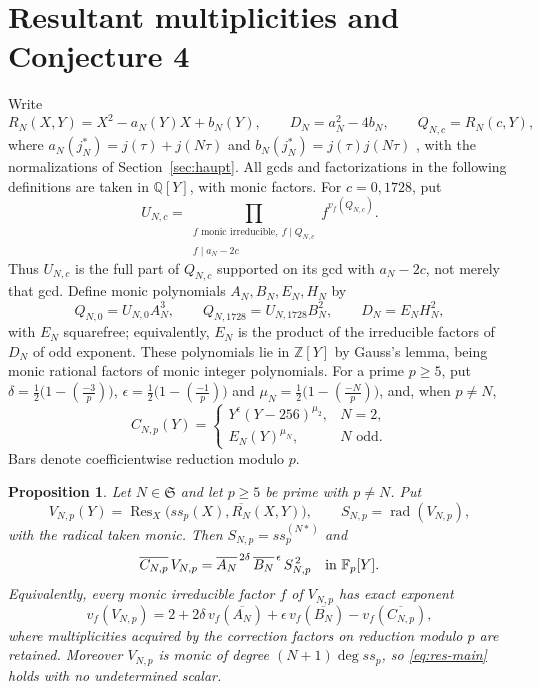 \documentclass[11pt,a4paper]{article}
\newtheorem{proposition}[theorem]{Proposition}
\theoremstyle{remark}\newtheorem{remark}[theorem]{Remark}
\numberwithin{equation}{section}
\newcommand{\Q}{\mathbb Q}\newcommand{\Z}{\mathbb Z}
\newcommand{\leg}[2]{\left(\frac{#1}{#2}\right)}
\begin{document}
	\section{Resultant multiplicities and Conjecture 4}\label{sec:resultant}
	Write
	\[
	R_N(X,Y)=X^2-a_N(Y)X+b_N(Y),\qquad D_N=a_N^2-4b_N,\qquad Q_{N,c}=R_N(c,Y),
	\]
	where $a_N(j_N^*)=j(\tau)+j(N\tau)$ and $b_N(j_N^*)=j(\tau)j(N\tau)$ \cite[Proposition~4]{Nakaya}, with the normalizations of Section~\ref{sec:haupt}. All gcds and factorizations in the following definitions are taken in $\Q[Y]$, with monic factors. For $c=0,1728$, put
	\begin{equation}\label{eq:res-U}
		U_{N,c}=\prod_{\substack{f\text{ monic irreducible},\ f\mid Q_{N,c}\\ f\mid a_N-2c}} f^{v_f(Q_{N,c})}.
	\end{equation}
	Thus $U_{N,c}$ is the full part of $Q_{N,c}$ supported on its gcd with $a_N-2c$, not merely that gcd. Define monic polynomials $A_N,B_N,E_N,H_N$ by
	\begin{equation}\label{eq:res-ABE}
		Q_{N,0}=U_{N,0}A_N^3,\qquad Q_{N,1728}=U_{N,1728}B_N^2,\qquad D_N=E_NH_N^2,
	\end{equation}
	with $E_N$ squarefree; equivalently, $E_N$ is the product of the irreducible factors of $D_N$ of odd exponent. These polynomials lie in $\Z[Y]$ by Gauss's lemma, being monic rational factors of monic integer polynomials. For a prime $p\geq5$, put $\delta=\tfrac12\bigl(1-\leg{-3}{p}\bigr)$, $\epsilon=\tfrac12\bigl(1-\leg{-1}{p}\bigr)$ and $\mu_N=\tfrac12\bigl(1-\leg{-N}{p}\bigr)$, and, when $p\neq N$,
	\begin{equation}\label{eq:res-C}
		C_{N,p}(Y)=\begin{cases}
			Y^{\epsilon}(Y-256)^{\mu_2},&N=2,\\
			E_N(Y)^{\mu_N},&N\text{ odd}.
		\end{cases}
	\end{equation}
	Bars denote coefficientwise reduction modulo $p$.
	
	\begin{proposition}\label{prop:resultant}
		Let $N\in\mathfrak S$ and let $p\geq5$ be prime with $p\neq N$. Put
		\[
		V_{N,p}(Y)=\operatorname{Res}_X\bigl(ss_p(X),\overline{R_N}(X,Y)\bigr),\qquad S_{N,p}=\operatorname{rad}(V_{N,p}),
		\]
		with the radical taken monic. Then $S_{N,p}=ss_p^{(N*)}$ and
		\begin{equation}\label{eq:res-main}
			\overline{C_{N,p}}\,V_{N,p}=\overline{A_N}^{\,2\delta}\,\overline{B_N}^{\,\epsilon}\,S_{N,p}^{\,2}\quad\text{in }\mathbb F_p[Y].
		\end{equation}
		Equivalently, every monic irreducible factor $f$ of $V_{N,p}$ has exact exponent
		\begin{equation}\label{eq:res-exponent}
			v_f(V_{N,p})=2+2\delta\,v_f(\overline{A_N})+\epsilon\,v_f(\overline{B_N})-v_f(\overline{C_{N,p}}),
		\end{equation}
		where multiplicities acquired by the correction factors on reduction modulo $p$ are retained. Moreover $V_{N,p}$ is monic of degree $(N+1)\deg ss_p$, so \eqref{eq:res-main} holds with no undetermined scalar.
	\end{proposition}
	
\end{document}
